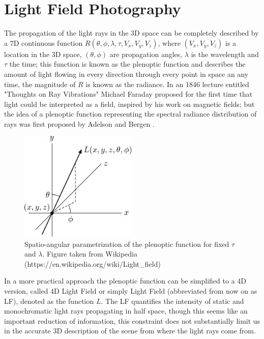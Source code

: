 
\chapter{Light Field Photography}

The propagation of the light rays in the 3D space can be completely described by a 7D continuous function $R(\theta,\phi,\lambda,\tau,V_x,V_y,V_z)$, where $(V_x,V_y,V_z)$ is a location in the 3D space, $(\theta,\phi)$ are propagation angles, $\lambda$ is the wavelength and $\tau$ the time; this function is known as the plenoptic function and describes the amount of light flowing in every direction through every point in space an any time, the magnitude of $R$ is known as the radiance.  In an 1846 lecture entitled "Thoughts on Ray Vibrations" Michael Faraday proposed for the first time that light could be interpreted as a field, inspired by his work on magnetic fields; but the idea of a plenoptic function representing the spectral radiance distribution of rays was first proposed by Adelson and Bergen \cite{Adelson-Plenoptic}. 

\begin{figure}[h!]
\centering
\includegraphics[width=0.5\textwidth]{./Diagrams/Plenoptic_function.jpg}
\caption{Spatio-angular parametrization of the plenoptic function for fixed $\tau$ and $\lambda$. Figure taken from Wikipedia (https://en.wikipedia.org/wiki/Light\_field)}
\end{figure}

In a more practical approach the plenoptic function can be simplified to a 4D version, called 4D Light Field or simply Light Field (abbreviated from now on as LF), denoted as the function $L$. The LF quantifies the intensity of static and monochromatic light rays propagating in half space, though this seems like an important reduction of information, this constraint does not substantially limit us in the accurate 3D description of the scene from where the light rays come from.

